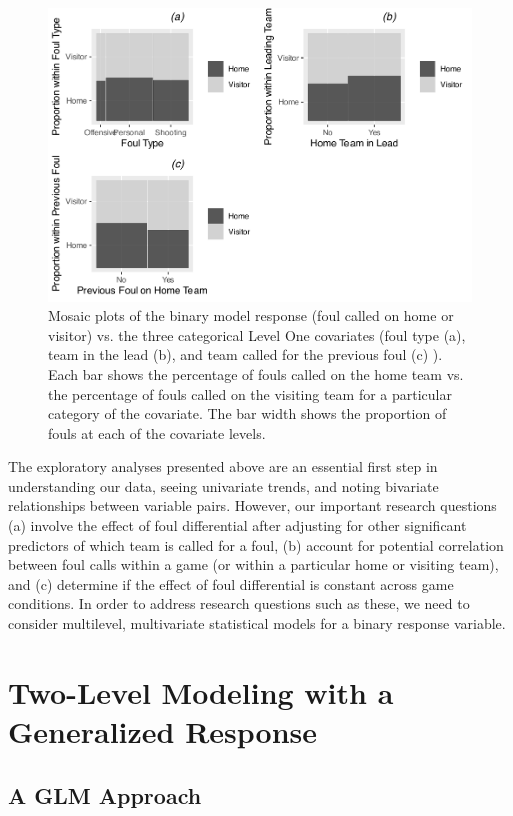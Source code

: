 \documentclass[
]{krantz}
\begin{document}
\begin{figure}

{\centering \includegraphics[width=0.6\linewidth]{bookdown-BeyondMLR_files/figure-latex/gmu-barmat1-1} 

}

\caption{Mosaic plots of the binary model response (foul called on home or visitor) vs. the three categorical Level One covariates (foul type (a), team in the lead (b), and team called for the previous foul (c) ).  Each bar shows the percentage of fouls called on the home team vs. the percentage of fouls called on the visiting team for a particular category of the covariate.  The bar width shows the proportion of fouls at each of the covariate levels.}\label{fig:gmu-barmat1}
\end{figure}

The exploratory analyses presented above are an essential first step in understanding our data, seeing univariate trends, and noting bivariate relationships between variable pairs. However, our important research questions (a) involve the effect of foul differential after adjusting for other significant predictors of which team is called for a foul, (b) account for potential correlation between foul calls within a game (or within a particular home or visiting team), and (c) determine if the effect of foul differential is constant across game conditions. In order to address research questions such as these, we need to consider multilevel, multivariate statistical models for a binary response variable.

\hypertarget{twolevelmodeling-glmm}{%
\section{Two-Level Modeling with a Generalized Response}\label{twolevelmodeling-glmm}}

\hypertarget{multregr-glmm}{%
\subsection{A GLM Approach}\label{multregr-glmm}}
\end{document}
